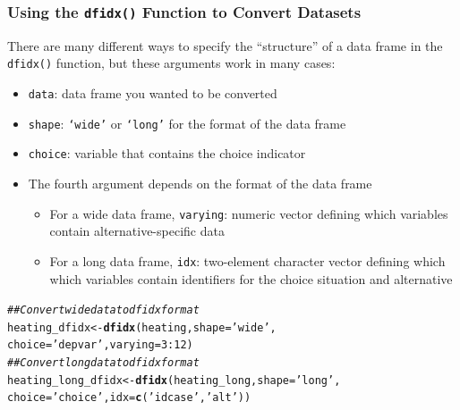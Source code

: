 \documentclass{beamer}\usepackage[]{graphicx}\usepackage[]{xcolor}
\makeatletter
\newcommand{\hlnum}[1]{\textcolor[rgb]{0.686,0.059,0.569}{#1}}%
\newcommand{\hlstr}[1]{\textcolor[rgb]{0.192,0.494,0.8}{#1}}%
\newcommand{\hlcom}[1]{\textcolor[rgb]{0.678,0.584,0.686}{\textit{#1}}}%
\newcommand{\hlopt}[1]{\textcolor[rgb]{0,0,0}{#1}}%
\newcommand{\hlstd}[1]{\textcolor[rgb]{0.345,0.345,0.345}{#1}}%
\newcommand{\hlkwb}[1]{\textcolor[rgb]{0.69,0.353,0.396}{#1}}%
\newcommand{\hlkwc}[1]{\textcolor[rgb]{0.333,0.667,0.333}{#1}}%
\newcommand{\hlkwd}[1]{\textcolor[rgb]{0.737,0.353,0.396}{\textbf{#1}}}%
\newenvironment{kframe}{%
 \def\at@end@of@kframe{}%
 \ifinner\ifhmode%
  \def\at@end@of@kframe{\end{minipage}}%
  \begin{minipage}{\columnwidth}%
 \fi\fi%
 \def\FrameCommand##1{\hskip\@totalleftmargin \hskip-\fboxsep
 \colorbox{shadecolor}{##1}\hskip-\fboxsep
     \hskip-\linewidth \hskip-\@totalleftmargin \hskip\columnwidth}%
 \MakeFramed {\advance\hsize-\width
   \@totalleftmargin\z@ \linewidth\hsize
   \@setminipage}}%
 {\par\unskip\endMakeFramed%
 \at@end@of@kframe}
\newenvironment{knitrout}{}{} %
\makeatother
\begin{document}
\begin{frame}[fragile]\frametitle{Using the \texttt{dfidx()} Function to Convert Datasets}
    There are many different ways to specify the ``structure'' of a data frame in the \texttt{dfidx()} function, but these arguments work in many cases:
    \begin{itemize}
    	\item \texttt{data}: data frame you wanted to be converted
    	\item \texttt{shape}: \texttt{`wide'} or \texttt{`long'} for the format of the data frame
    	\item \texttt{choice}: variable that contains the choice indicator
    	\item The fourth argument depends on the format of the data frame
    	\begin{itemize}
    		\item For a wide data frame, \texttt{varying}: numeric vector defining which variables contain alternative-specific data
    		\item For a long data frame, \texttt{idx}: two-element character vector defining which which variables contain identifiers for the choice situation and alternative
    	\end{itemize}
    \end{itemize}
\begin{knitrout}\footnotesize
{}\color{fgcolor}\begin{kframe}
\begin{alltt}
\hlcom{## Convert wide data to dfidx format}
\hlstd{heating_dfidx} \hlkwb{<-} \hlkwd{dfidx}\hlstd{(heating,} \hlkwc{shape} \hlstd{=} \hlstr{'wide'}\hlstd{,}
                       \hlkwc{choice} \hlstd{=} \hlstr{'depvar'}\hlstd{,} \hlkwc{varying} \hlstd{=} \hlnum{3}\hlopt{:}\hlnum{12}\hlstd{)}
\hlcom{## Convert long data to dfidx format}
\hlstd{heating_long_dfidx} \hlkwb{<-} \hlkwd{dfidx}\hlstd{(heating_long,} \hlkwc{shape} \hlstd{=} \hlstr{'long'}\hlstd{,}
                            \hlkwc{choice} \hlstd{=} \hlstr{'choice'}\hlstd{,} \hlkwc{idx} \hlstd{=} \hlkwd{c}\hlstd{(}\hlstr{'idcase'}\hlstd{,} \hlstr{'alt'}\hlstd{))}
\end{alltt}
\end{kframe}
\end{knitrout}
\end{frame}
\end{document}

